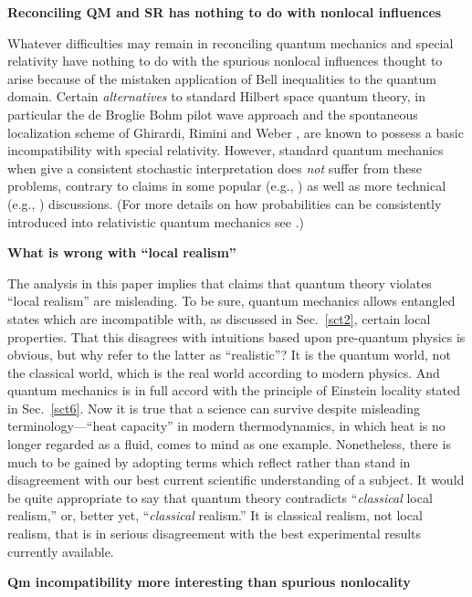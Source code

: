 \documentclass[12pt]{article} %
\def\outl#1{\par{\medskip\noindent\hspace*{.5cm}\bf
      \mathversion{bold}#1\mathversion{normal}\smallskip} }
\def\np{} \def\xa{} \def\xb{} \def\xn{} \def\xp{}
\def\outl#1{} \def\np{} \def\xa{} \def\xb{} \def\xn{} \def\xp{}
\def\outl#1{\par{\medskip\noindent\hspace*{.5cm}\bf
      \mathversion{bold}#1\mathversion{normal}\smallskip} }
\def\np{\newpage }\def\xn{\nopagebreak }\def\xp{\pagebreak }
\begin{document}
\xb
\outl{Reconciling QM and SR has nothing to do with nonlocal influences}
\xa


Whatever difficulties may remain in reconciling quantum mechanics and special
relativity have nothing to do with the spurious nonlocal influences thought to
arise because of the mistaken application of Bell inequalities to the quantum
domain. Certain \emph{alternatives} to standard Hilbert space quantum theory,
in particular the de Broglie Bohm pilot wave approach \cite{Glds06} and the
spontaneous localization scheme of Ghirardi, Rimini and Weber \cite{BsGh03},
are known to possess a basic incompatibility with special relativity.
However, standard quantum mechanics when give a consistent stochastic
interpretation does \emph{not} suffer from these problems, contrary to claims
in some popular (e.g., \cite{AlGl09}) as well as more technical (e.g.,
\cite{Mdln02}) discussions. (For more details on how probabilities can be
consistently introduced into relativistic quantum mechanics see
\cite{Grff02b}.)

\xb
\outl{What is wrong with ``local realism''}
\xa



The analysis in this paper implies that claims that quantum theory violates
``local realism'' are misleading. To be sure, quantum mechanics allows
entangled states which are incompatible with, as discussed in Sec.~\ref{sct2},
certain local properties.  That this disagrees with intuitions based upon
pre-quantum physics is obvious, but why refer to the latter as ``realistic''?
It is the quantum world, not the classical world, which is the real world
according to modern physics. And quantum mechanics is in full accord with the
principle of Einstein locality stated in Sec.~\ref{sct6}.  Now it is true that
a science can survive despite misleading terminology---``heat capacity'' in
modern thermodynamics, in which heat is no longer regarded as a fluid, comes
to mind as one example.  Nonetheless, there is much to be gained by adopting
terms which reflect rather than stand in disagreement with our best current
scientific understanding of a subject.  It would be quite appropriate to say
that quantum theory contradicts ``\emph{classical} local realism,'' or, better
yet, ``\emph{classical} realism.''  It is classical realism, not local
realism, that is in serious disagreement with the best experimental results
currently available.

\xb
\outl{Qm incompatibility more interesting than spurious nonlocality}
\xa
\end{document}
